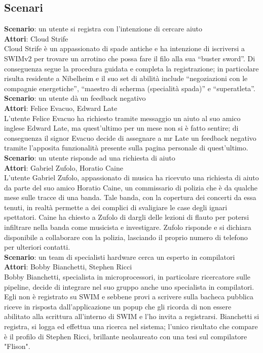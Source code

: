 \documentclass[a4paper,12pt]{article}
\begin{document}
\subsection{Scenari}
\textbf{Scenario}: un utente si registra con l'intenzione di cercare aiuto \\
\textbf{Attori}: Cloud Strife \\
Cloud Strife è un appassionato di spade antiche e ha intenzione di iscriversi a SWIMv2 per trovare un arrotino che possa fare il filo alla sua “buster sword”. Di conseguenza segue la procedura guidata  e completa la registrazione; in particolare risulta residente a Nibelheim e il suo set di abilità include “negoziazioni con le compagnie energetiche”, “maestro di scherma (specialità spada)” e “superatleta”. \\[1.5em]
\textbf{Scenario}: un utente dà un feedback negativo \\
\textbf{Attori}: Felice Evacuo, Edward Late \\
L'utente Felice Evacuo ha richiesto tramite messaggio un aiuto al suo amico inglese Edward Late, ma quest'ultimo per un mese non si è fatto sentire; di conseguenza il signor Evacuo decide di assegnare a mr Late un feedback negativo tramite l'apposita funzionalità presente sulla pagina personale di quest'ultimo. \\[1.5em]
\textbf{Scenario}: un utente risponde ad una richiesta di aiuto \\
\textbf{Attori}: Gabriel Zufolo, Horatio Caine \\
L'utente Gabriel Zufolo, appassionato di musica ha ricevuto una richiesta di aiuto da parte del suo amico Horatio Caine, un commissario di polizia che è da qualche mese sulle tracce di una banda. Tale banda, con la copertura dei concerti da essa tenuti, in realtà permette a dei complici di svaligiare le case degli ignari spettatori. Caine ha chiesto a Zufolo di dargli delle lezioni di flauto per potersi infiltrare nella banda come musicista e investigare. Zufolo risponde e si dichiara disponibile a collaborare con la polizia, lasciando il proprio numero di telefono per ulteriori contatti. \\[1.5em]
\textbf{Scenario}: un team di specialisti hardware cerca un esperto in compilatori \\
\textbf{Attori}: Bobby Bianchetti, Stephen Ricci \\
Bobby Bianchetti, specialista in microprocessori, in particolare ricercatore sulle pipeline, decide di integrare nel suo gruppo anche uno specialista in compilatori. Egli non è registrato su SWIM e sebbene provi a scrivere sulla bacheca pubblica riceve in risposta dall'applicazione un popup che gli ricorda di non essere abilitato alla scrittura all'interno di SWIM e l'ho invita a registrarsi. Bianchetti si registra, si logga ed effettua una ricerca nel sistema; l'unico risultato che compare è il profilo di Stephen Ricci, brillante neolaureato con una tesi sul compilatore "Flison".   \\[1.5em]
\end{document}
